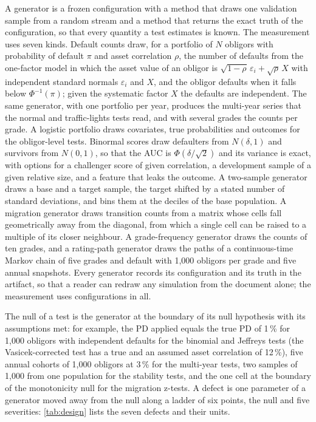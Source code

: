 A generator is a frozen configuration with a method that draws one validation sample from a random stream and a method that returns the exact truth of the configuration, so that every quantity a test estimates is known.
The measurement uses seven kinds.
Default counts draw, for a portfolio of $N$ obligors with probability of default $\pi$ and asset correlation $\rho$, the number of defaults from the one-factor model in which the asset value of an obligor is $\sqrt{1-\rho}\,\varepsilon_i+\sqrt{\rho}\,X$ with independent standard normals $\varepsilon_i$ and $X$, and the obligor defaults when it falls below $\Phi^{-1}(\pi)$; given the systematic factor $X$ the defaults are independent.
The same generator, with one portfolio per year, produces the multi-year series that the normal and traffic-lights tests read, and with several grades the counts per grade.
A logistic portfolio draws covariates, true probabilities and outcomes for the obligor-level tests.
Binormal scores draw defaulters from $N(\delta,1)$ and survivors from $N(0,1)$, so that the AUC is $\Phi(\delta/\sqrt2)$ and its variance is exact, with options for a challenger score of given correlation, a development sample of a given relative size, and a feature that leaks the outcome.
A two-sample generator draws a base and a target sample, the target shifted by a stated number of standard deviations, and bins them at the deciles of the base population.
A migration generator draws transition counts from a matrix whose cells fall geometrically away from the diagonal, from which a single cell can be raised to a multiple of its closer neighbour.
A grade-frequency generator draws the counts of ten grades, and a rating-path generator draws the paths of a continuous-time Markov chain of five grades and default with 1,000 obligors per grade and five annual snapshots.
Every generator records its configuration and its truth in the artifact, so that a reader can redraw any simulation from the document alone; the measurement uses \nGens{} configurations in all.

The null of a test is the generator at the boundary of its null hypothesis with its assumptions met: for example, the PD applied equals the true PD of 1\,\% for 1,000 obligors with independent defaults for the binomial and Jeffreys tests (the Vasicek-corrected test has a true and an assumed asset correlation of 12\,\%), five annual cohorts of 1,000 obligors at 3\,\% for the multi-year tests, two samples of 1,000 from one population for the stability tests, and the one cell at the boundary of the monotonicity null for the migration z-tests.
A defect is one parameter of a generator moved away from the null along a ladder of six points, the null and five severities: \cref{tab:design} lists the seven defects and their units.

